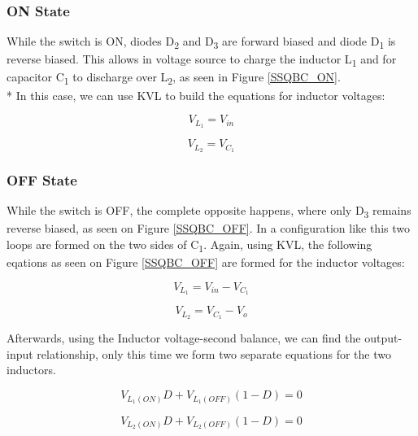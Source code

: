 \subsubsection{ON State}
While the switch is ON, diodes D\textsubscript{2} and D\textsubscript{3} are forward biased and diode D\textsubscript{1} is reverse biased.
This allows in voltage source to charge the inductor L\textsubscript{1} and for capacitor C\textsubscript{1} to discharge over L\textsubscript{2}, as seen in Figure \ref{SSQBC_ON}.
\\*
In this case, we can use KVL to build the equations for inductor voltages: 

\begin{equation}
	V_{L_1}=V_{in}
	\label{eq:SSQBC_KVL_ON}
\end{equation}

\begin{equation}
	V_{L_2}=V_{C_1}
	\label{eq:SSQBC_KVL_ON2}
\end{equation}

\subsubsection{OFF State}
While the switch is OFF, the complete opposite happens, where only D\textsubscript{3} remains reverse biased, as seen on Figure \ref{SSQBC_OFF}.
In a configuration like this two loops are formed on the two sides of C\textsubscript{1}. Again, using KVL, the following eqations as seen on Figure \ref{SSQBC_OFF} are formed for the inductor voltages:

\begin{equation}
	V_{L_1}=V_{in}-V_{C_1}
	\label{eq:SSQBC_KVL_OFF}
\end{equation}

\begin{equation}
	V_{L_2}=V_{C_1}-V_{o}
	\label{eq:SSQBC_KVL_OFF2}
\end{equation}

Afterwards, using the Inductor voltage-second balance, we can find the output-input relationship, only this time we form two separate equations for the two inductors. 

\begin{equation}
	V_{L_1(ON)}D+V_{L_1(OFF)}(1-D)=0
	\label{eq:SSQBC_IVSB}
\end{equation}

\begin{equation}
	V_{L_2(ON)}D+V_{L_2(OFF)}(1-D)=0
	\label{eq:SSQBC_IVSB2}
\end{equation}

